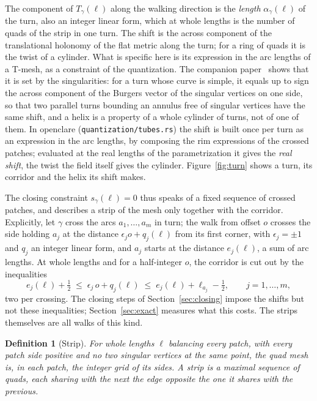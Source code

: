 \documentclass[11pt,a4paper]{article}
\newtheorem{definition}{Definition}
\newcommand{\shift}{s}
\begin{document}
The component of $T_\gamma(\ell)$ along the walking direction is the
\emph{length} $\alpha_\gamma(\ell)$ of the turn, also an integer linear form,
which at whole lengths is the number of quads of the strip in one turn. The
shift is the across component of the translational holonomy of the flat
metric along the turn; for a ring of quads it is the
twist of a cylinder. What is specific here is its expression in the arc
lengths of a T-mesh, as a constraint of the quantization. The companion
paper~\cite{gardent2026turns} shows that it is set by the singularities: for
a turn whose curve is simple, it equals up to sign the across component of
the Burgers vector of the singular vertices on one side, so that two parallel turns bounding an annulus free
of singular vertices have the same shift, and a helix is a property of a
whole cylinder of turns, not of one of them. In openclare
(\texttt{quantization/tubes.rs}) the shift is built once per turn as an
expression in the arc lengths, by composing the rim expressions of the
crossed patches; evaluated at the real lengths of the parametrization it
gives the \emph{real shift}, the twist the field itself gives the cylinder.
Figure~\ref{fig:turn} shows a turn, its corridor and the helix its shift
makes.

The closing constraint $\shift_\gamma(\ell) = 0$ thus speaks of a fixed
sequence of crossed patches, and describes a strip of the mesh only together
with the corridor. Explicitly, let $\gamma$ cross the arcs $a_1, \dots, a_m$
in turn; the walk from offset $o$ crosses the side holding $a_j$ at the
distance $\epsilon_j o + q_j(\ell)$ from its first corner, with $\epsilon_j =
\pm 1$ and $q_j$ an integer linear form, and $a_j$ starts at the distance
$e_j(\ell)$, a sum of arc lengths. At whole lengths and for a half-integer
$o$, the corridor is cut out by the inequalities
\begin{equation}\label{eq:corridor}
  e_j(\ell) + \tfrac12 \;\le\; \epsilon_j\, o + q_j(\ell) \;\le\; e_j(\ell) +
  \ell_{a_j} - \tfrac12, \qquad j = 1, \dots, m,
\end{equation}
two per crossing. The closing steps of Section~\ref{sec:closing} impose the
shifts but not these inequalities; Section~\ref{sec:exact} measures what
this costs. The strips themselves are all walks of this kind.

\begin{definition}[Strip]
For whole lengths $\ell$ balancing every patch, with every patch side
positive and no two singular vertices at the same point, the quad mesh is, in
each patch, the integer grid of its sides. A \emph{strip} is a maximal
sequence of quads, each sharing with the next the edge opposite the one it
shares with the previous.
\end{definition}
\end{document}
